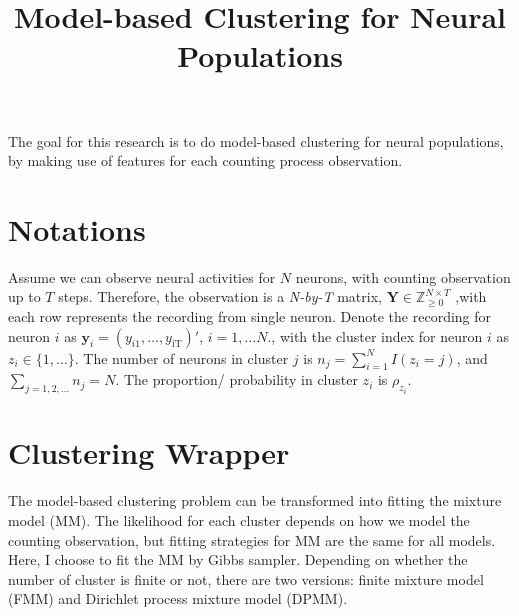 \documentclass[]{article}
\title{Model-based Clustering for Neural Populations}
\author{}
\date{}
\begin{document}
\maketitle

The goal for this research is to do model-based clustering for  neural populations, by making use of features for each counting process observation. 

\section{Notations}

Assume we can observe neural activities for \(N\) neurons, with counting observation up to \(T\) steps. Therefore, the observation is a \textsl{N-by-T} matrix, \(\mathbf{Y} \in \mathbb{Z}_{\geq 0}^{N \times T}\) ,with each row represents the recording from single neuron. Denote the recording for neuron \(i\) as
\(\mathbf{y}_{i} = (y_{i1},\ldots,y_{\text{iT}})'\), \(i = 1,\ldots N.\), with the cluster index for neuron \(i\) as
\(z_{i} \in \{ 1,\ldots\}\). The number of neurons in cluster \(j\) is
\(n_{j} = \sum_{i = 1}^{N}{I(z_{i} = j)}\), and
\(\sum_{j = 1,2,\ldots}^{}n_{j} = N\). The proportion/ probability in
cluster \(z_{i}\) is \(\rho_{z_{i}}\).

\section{Clustering Wrapper}
The model-based clustering problem can be transformed into fitting the mixture model (MM). The likelihood for each cluster depends on how we model the counting observation, but fitting strategies for MM are the same for all models. Here, I choose to fit the MM by Gibbs sampler. Depending on whether the number of cluster is finite or not, there are two versions: finite mixture model (FMM) and Dirichlet process mixture model (DPMM).
\end{document}
